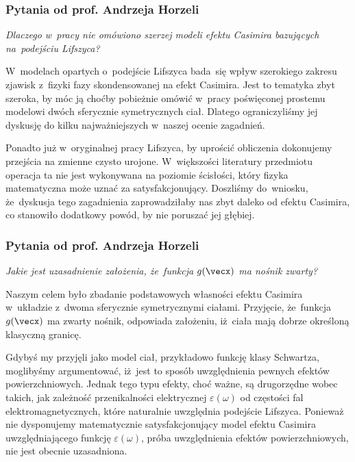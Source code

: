 \documentclass[10pt,t]{beamer}
\begin{document}
\begin{frame}
  \frametitle{Pytania od prof. Andrzeja Horzeli}


  \textit{Dlaczego w~pracy nie omówiono szerzej modeli efektu
    Casimira bazujących na~podejściu Lifszyca?}

  W~modelach opartych o~podejście Lifszyca bada~się wpływ szerokiego
  zakresu zjawisk z~fizyki fazy skondensowanej na efekt Casimira.
  Jest to tematyka zbyt szeroka, by móc ją choćby pobieżnie omówić w~pracy
  poświęconej prostemu modelowi dwóch sferycznie symetrycznych ciał.
  Dlatego ograniczyliśmy jej dyskusję do kilku najważniejszych
  w~naszej ocenie zagadnień.

  Ponadto już w~oryginalnej pracy Lifszyca, by uprościć obliczenia
  dokonujemy przejścia na zmienne czysto urojone. W~większości literatury
  przedmiotu operacja ta nie jest wykonywana na poziomie ścisłości,
  który fizyka matematyczna może uznać za satysfakcjonujący. Doszliśmy
  do~wniosku, że~dyskusja tego zagadnienia zaprowadziłaby nas zbyt daleko
  od efektu Casimira, co stanowiło dodatkowy powód, by nie poruszać jej
  głębiej.

\end{frame}





\begin{frame}
  \frametitle{Pytania od prof. Andrzeja Horzeli}


  \textit{Jakie jest uzasadnienie założenia, że~funkcja $g( \vecx )$ ma
    nośnik zwarty?}

  Naszym celem było zbadanie podstawowych własności efektu Casimira
  w~układzie z~dwoma sferycznie symetrycznymi ciałami. Przyjęcie,
  że~funkcja $g( \vecx )$ ma zwarty nośnik, odpowiada założeniu,
  iż~ciała mają dobrze określoną klasyczną granicę.

  Gdybyś my przyjęli jako model ciał, przykładowo funkcję klasy Schwartza,
  moglibyśmy argumentować, iż~jest to sposób uwzględnienia pewnych efektów
  powierzchniowych. Jednak tego typu efekty, choć ważne, są drugorzędne
  wobec takich, jak zależność przenikalności elektrycznej
  $\varepsilon( \omega )$ od częstości fal elektromagnetycznych, które naturalnie
  uwzględnia podejście Lifszyca. Ponieważ nie dysponujemy matematycznie
  satysfakcjonujący model efektu Casimira uwzględniającego funkcję
  $\varepsilon( \omega )$, próba uwzględnienia efektów powierzchniowych, nie jest obecnie
  uzasadniona.

\end{frame}
\end{document}
